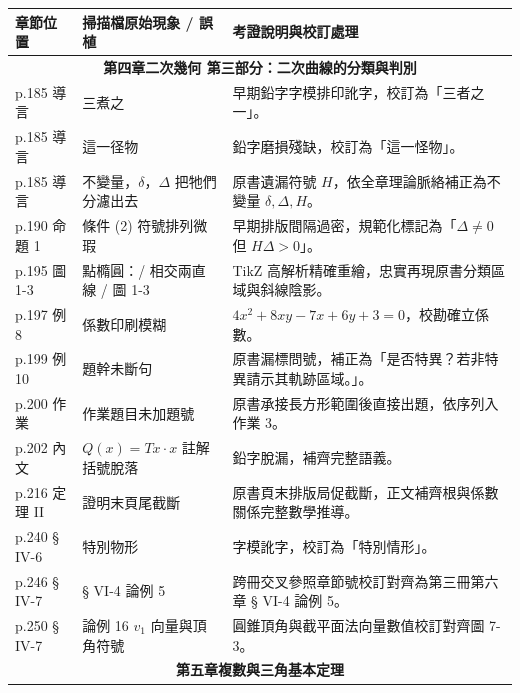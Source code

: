 \documentclass[a4paper,12pt,twoside]{article}
\begin{document}
\begin{table}[H]
\centering
\small
\renewcommand{\arraystretch}{1.35}
\begin{tabularx}{\textwidth}{|p{3.0cm}|p{3.8cm}|X|}
\hline
\textbf{章節位置} & \textbf{掃描檔原始現象 / 誤植} & \textbf{考證說明與校訂處理} \\ \hline

\multicolumn{3}{|c|}{\textbf{第四章\quad 二次幾何 第三部分：二次曲線的分類與判別}} \\ \hline

p.185 導言 & 三煮之 & 早期鉛字字模排印訛字，校訂為「三者之一」。 \\ \hline
p.185 導言 & 這一径物 & 鉛字磨損殘缺，校訂為「這一怪物」。 \\ \hline
p.185 導言 & 不變量，$\delta$，$\Delta$ 把牠們分濾出去 & 原書遺漏符號 $H$，依全章理論脈絡補正為不變量 $\delta, \Delta, H$。 \\ \hline
p.190 命題 1 & 條件 (2) 符號排列微瑕 & 早期排版間隔過密，規範化標記為「$\Delta \ne 0$ 但 $H\Delta > 0$」。 \\ \hline
p.195 圖 1-3 & 點橢圓：/ 相交兩直線 / 圖 1-3 & TikZ 高解析精確重繪，忠實再現原書分類區域與斜線陰影。 \\ \hline
p.197 例 8 & 係數印刷模糊 & $4x^2 + 8xy - 7x + 6y + 3 = 0$，校勘確立係數。 \\ \hline
p.199 例 10 & 題幹未斷句 & 原書漏標問號，補正為「是否特異？若非特異請示其軌跡區域。」。 \\ \hline
p.200 作業 & 作業題目未加題號 & 原書承接長方形範圍後直接出題，依序列入作業 3。 \\ \hline
p.202 內文 & $Q(x) = Tx \cdot x$ 註解括號脫落 & 鉛字脫漏，補齊完整語義。 \\ \hline
p.216 定理 II & 證明末頁尾截斷 & 原書頁末排版局促截斷，正文補齊根與係數關係完整數學推導。 \\ \hline
p.240 § IV-6 & 特別物形 & 字模訛字，校訂為「特別情形」。 \\ \hline
p.246 § IV-7 & § VI-4 論例 5 & 跨冊交叉參照章節號校訂對齊為第三冊第六章 § VI-4 論例 5。 \\ \hline
p.250 § IV-7 & 論例 16 $v_1$ 向量與頂角符號 & 圓錐頂角與截平面法向量數值校訂對齊圖 7-3。 \\ \hline

\multicolumn{3}{|c|}{\textbf{第五章\quad 複數與三角基本定理}} \\ \hline


\end{tabularx}
\end{table}
\end{document}
